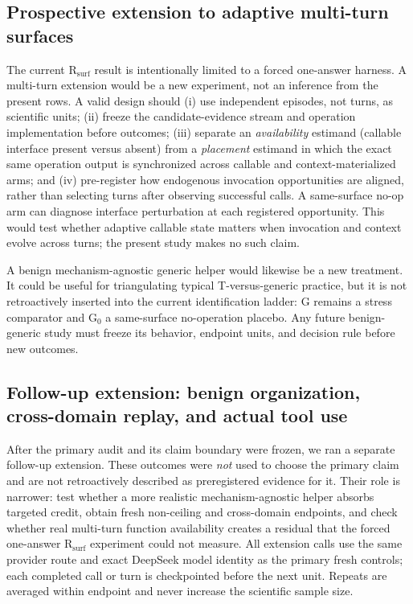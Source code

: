 \subsection{Prospective extension to adaptive multi-turn surfaces}
The current R$_{\mathrm{surf}}$ result is intentionally limited to a forced one-answer harness. A multi-turn extension would be a new experiment, not an inference from the present rows. A valid design should (i) use independent episodes, not turns, as scientific units; (ii) freeze the candidate-evidence stream and operation implementation before outcomes; (iii) separate an \emph{availability} estimand (callable interface present versus absent) from a \emph{placement} estimand in which the exact same operation output is synchronized across callable and context-materialized arms; and (iv) pre-register how endogenous invocation opportunities are aligned, rather than selecting turns after observing successful calls. A same-surface no-op arm can diagnose interface perturbation at each registered opportunity. This would test whether adaptive callable state matters when invocation and context evolve across turns; the present study makes no such claim.

A benign mechanism-agnostic generic helper would likewise be a new treatment. It could be useful for triangulating typical T-versus-generic practice, but it is not retroactively inserted into the current identification ladder: G remains a stress comparator and G$_0$ a same-surface no-operation placebo. Any future benign-generic study must freeze its behavior, endpoint units, and decision rule before new outcomes.

\subsection{Follow-up extension: benign organization, cross-domain replay, and actual tool use}\label{sec:followup-extension}
After the primary audit and its claim boundary were frozen, we ran a separate follow-up extension. These outcomes were \emph{not} used to choose the primary claim and are not retroactively described as preregistered evidence for it. Their role is narrower: test whether a more realistic mechanism-agnostic helper absorbs targeted credit, obtain fresh non-ceiling and cross-domain endpoints, and check whether real multi-turn function availability creates a residual that the forced one-answer R$_{\mathrm{surf}}$ experiment could not measure. All extension calls use the same provider route and exact DeepSeek model identity as the primary fresh controls; each completed call or turn is checkpointed before the next unit. Repeats are averaged within endpoint and never increase the scientific sample size.

